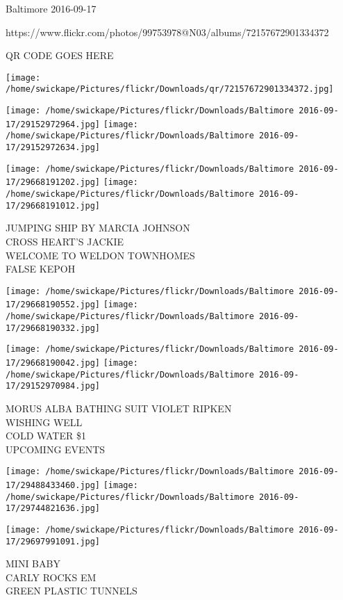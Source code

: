 \documentclass[10pt,letterpaper]{article}
\begin{document}
Baltimore 2016-09-17

https://www.flickr.com/photos/99753978@N03/albums/72157672901334372

QR CODE GOES HERE

\texttt{[image: /home/swickape/Pictures/flickr/Downloads/qr/72157672901334372.jpg]}
\pagebreak

\texttt{[image: /home/swickape/Pictures/flickr/Downloads/Baltimore 2016-09-17/29152972964.jpg]}
\texttt{[image: /home/swickape/Pictures/flickr/Downloads/Baltimore 2016-09-17/29152972634.jpg]}

\texttt{[image: /home/swickape/Pictures/flickr/Downloads/Baltimore 2016-09-17/29668191202.jpg]}
\texttt{[image: /home/swickape/Pictures/flickr/Downloads/Baltimore 2016-09-17/29668191012.jpg]}

JUMPING SHIP BY MARCIA JOHNSON\\
CROSS HEART'S JACKIE\\
WELCOME TO WELDON TOWNHOMES\\
FALSE KEPOH\\
\pagebreak

\texttt{[image: /home/swickape/Pictures/flickr/Downloads/Baltimore 2016-09-17/29668190552.jpg]}
\texttt{[image: /home/swickape/Pictures/flickr/Downloads/Baltimore 2016-09-17/29668190332.jpg]}

\texttt{[image: /home/swickape/Pictures/flickr/Downloads/Baltimore 2016-09-17/29668190042.jpg]}
\texttt{[image: /home/swickape/Pictures/flickr/Downloads/Baltimore 2016-09-17/29152970984.jpg]}

MORUS ALBA BATHING SUIT VIOLET RIPKEN\\
WISHING WELL\\
COLD WATER \$1\\
UPCOMING EVENTS\\
\pagebreak

\texttt{[image: /home/swickape/Pictures/flickr/Downloads/Baltimore 2016-09-17/29488433460.jpg]}
\texttt{[image: /home/swickape/Pictures/flickr/Downloads/Baltimore 2016-09-17/29744821636.jpg]}

\texttt{[image: /home/swickape/Pictures/flickr/Downloads/Baltimore 2016-09-17/29697991091.jpg]}

MINI BABY\\
CARLY ROCKS EM\\
GREEN PLASTIC TUNNELS\\
\pagebreak
\end{document}
